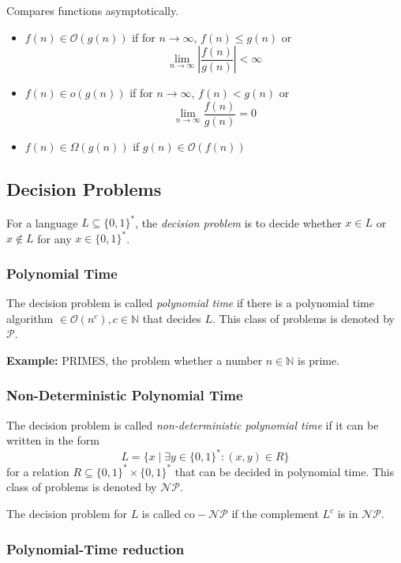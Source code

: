 \documentclass[a4paper]{scrartcl}
\newcommand\N{\mathbb N}
\newcommand\bigO{\mathcal O}
\newcommand\bigo o
\newcommand\compP{\mathcal{P}}
\newcommand\compNP{\mathcal{NP}}
\begin{document}
Compares functions asymptotically.

\begin{itemize}
    \item $f(n)\in\bigO(g(n))$ if for $n\rightarrow\infty$, $f(n) \leq g(n)$ or
        \[\lim_{n\rightarrow\infty}\left|\frac{f(n)}{g(n)}\right| < \infty\]
    \item $f(n)\in\bigo(g(n))$ if for $n\rightarrow\infty$, $f(n) < g(n)$ or
        \[\lim_{n\rightarrow\infty}\frac{f(n)}{g(n)} = 0\]
    \item $f(n)\in\Omega(g(n))$ if $g(n)\in\bigO(f(n))$
\end{itemize}

\subsection{Decision Problems}

For a language $L\subseteq\{0,1\}^*$, the \textit{decision problem} is to decide
whether $x\in L$ or $x\not\in L$ for any $x\in\{0,1\}^*$.

\subsubsection{Polynomial Time}

The decision problem is called \textit{polynomial time} if there is a polynomial
time algorithm $\in\bigO(n^c), c\in\N$ that decides $L$. This class of problems
is denoted by $\compP$.

\textbf{Example:} PRIMES, the problem whether a number $n\in\N$ is prime.

\subsubsection{Non-Deterministic Polynomial Time}

The decision problem is called \textit{non-deterministic polynomial time} if it
can be written in the form 
\[L=\{x\mid\exists y\in\{0,1\}^*:(x,y)\in R\}\]
for a relation $R\subseteq \{0,1\}^* \times \{0,1\}^*$ that can be decided
in polynomial time. This class of problems is denoted by $\compNP$.

\smallskip
The decision problem for $L$ is called $\mathrm{co-}\compNP$ if the complement $L^c$ is in
$\compNP$.

\subsubsection*{Polynomial-Time reduction}
\end{document}
